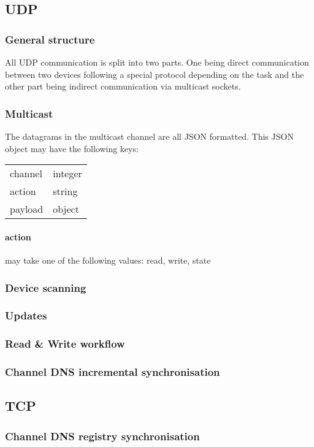 \documentclass[a4paper]{article}
\begin{document}
        \subsection{UDP}
	        \subsubsection{General structure}
		        All UDP communication is split into two parts. One being direct communication between two devices
		        following a special protocol depending on the task and the other part being indirect communication via
		        multicast sockets.
		    \subsubsection{Multicast}
			    The datagrams in the multicast channel are all JSON formatted. This JSON object may have the following
			    keys:\\
			    \begin{tabular}{l | l}
			        channel & integer\\
			    	action & string\\
			    	payload & object
			    \end{tabular}
			    \paragraph{action} may take one of the following values: read, write, state
	        \subsubsection{Device scanning}
            \subsubsection{Updates}
            \subsubsection{Read \& Write workflow}
            \subsubsection{Channel DNS incremental synchronisation}
        \subsection{TCP}
            \subsubsection{Channel DNS registry synchronisation}
\end{document}
